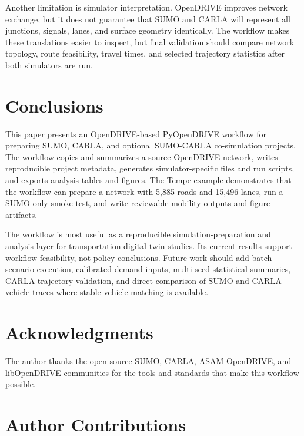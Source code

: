\documentclass[10pt,numbered]{\selectedmanuscriptclass}
\begin{document}
Another limitation is simulator interpretation. OpenDRIVE improves network
exchange, but it does not guarantee that SUMO and CARLA will represent all
junctions, signals, lanes, and surface geometry identically. The workflow makes
these translations easier to inspect, but final validation should compare
network topology, route feasibility, travel times, and selected trajectory
statistics after both simulators are run.

\section{Conclusions}\label{sec:conclusions}

This paper presents an OpenDRIVE-based PyOpenDRIVE workflow for preparing SUMO,
CARLA, and optional SUMO-CARLA co-simulation projects. The workflow copies and
summarizes a source OpenDRIVE network, writes reproducible project metadata,
generates simulator-specific files and run scripts, and exports analysis tables
and figures. The Tempe example demonstrates that the workflow can prepare a
network with 5,885 roads and 15,496 lanes, run a SUMO-only smoke test, and write
reviewable mobility outputs and figure artifacts.

The workflow is most useful as a reproducible simulation-preparation and
analysis layer for transportation digital-twin studies. Its current results
support workflow feasibility, not policy conclusions. Future work should add
batch scenario execution, calibrated demand inputs, multi-seed statistical
summaries, CARLA trajectory validation, and direct comparison of SUMO and CARLA
vehicle traces where stable vehicle matching is available.

\section{Acknowledgments}

The author thanks the open-source SUMO, CARLA, ASAM OpenDRIVE, and
libOpenDRIVE communities for the tools and standards that make this workflow
possible.


\section{Author Contributions}
\end{document}

